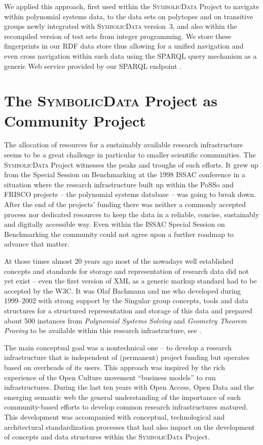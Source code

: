 \documentclass{mathincs}
\newcommand{\SD}{\textsc{Symbo\-lic\-Data}}
\begin{document}
We applied this approach, first used within the {\SD} Project to navigate
within polynomial systems data, to the data sets on polytopes and on transitive
groups newly integrated with {\SD} version~3, and also within the recompiled
version of test sets from integer programming.  We store these fingerprints in
our RDF data store \cite{sdstore} thus allowing for a unified navigation and
even cross navigation within such data using the SPARQL query mechanism as a
generic Web service provided by our SPARQL endpoint \cite{sdsparql}.  

\section{The {\SD} Project as Community Project}

The allocation of resources for a sustainably available research infrastructure
seems to be a great challenge in particular to smaller scientific communities.
The {\SD} Project witnesses the peaks and troughs of such efforts. It grew up
from the Special Session on Benchmarking at the 1998 ISSAC conference in a
situation where the research infrastructure built up within the PoSSo
\cite{PoSSo} and FRISCO \cite{FRISCO} projects -- the polynomial systems
database -- was going to break down. After the end of the projects' funding
there was neither a commonly accepted process nor dedicated resources to keep
the data in a reliable, concise, sustainably and digitally accessible way. Even
within the ISSAC Special Session on Benchmarking the community could not agree
upon a further roadmap to advance that matter.

At those times almost 20 years ago most of the nowadays well established
concepts and standards for storage and representation of research data did not
yet exist -- even the first version of XML as a generic markup standard had to
be accepted by the W3C. It was Olaf Bachmann and me who developed during
1999--2002 with strong support by the Singular group concepts, tools and data
structures for a structured representation and storage of this data and
prepared about 500 instances from \emph{Polynomial Systems Solving} and
\emph{Geometry Theorem Proving} to be available within this research
infrastructure, see \cite{Bachmann2000}.

The main conceptual goal was a nontechnical one -- to develop a research
infrastructure that is independent of (permanent) project funding but operates
based on overheads of its users. This approach was inspired by the rich
experience of the Open Culture movement ``business models'' to run
infrastructures.  During the last ten years with Open Access, Open Data and the
emerging semantic web the general understanding of the importance of such
community-based efforts to develop common research infrastructures matured.
This development was accompanied with conceptual, technological and
architectural standardization processes that had also impact on the development
of concepts and data structures within the {\SD} Project.
\end{document}
